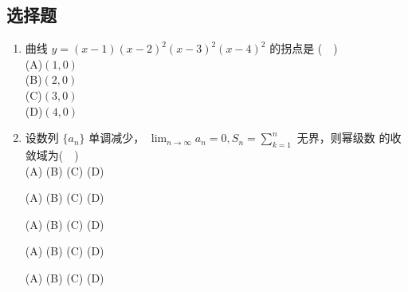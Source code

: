 \subsection{选择题}
\begin{enumerate}
\item 曲线 $y=(x-1)(x-2)^2(x-3)^2(x-4)^2$ 的拐点是  ($\quad$)\\
(A)$(1,0)$\\
(B)$(2,0)$\\
(C)$(3,0)$\\
(D)$(4,0)$
\item 设数列 $\{a_n\}$ 单调减少， $\displaystyle \lim_{n\to\infty} a_n=0,S_n=\sum_{k=1}^{n}$  无界，则幂级数  的收敛域为($\quad$)\\
(A)
(B)
(C)
(D)

(A)
(B)
(C)
(D)


(A)
(B)
(C)
(D)

(A)
(B)
(C)
(D)


(A)
(B)
(C)
(D)
\end{enumerate}
